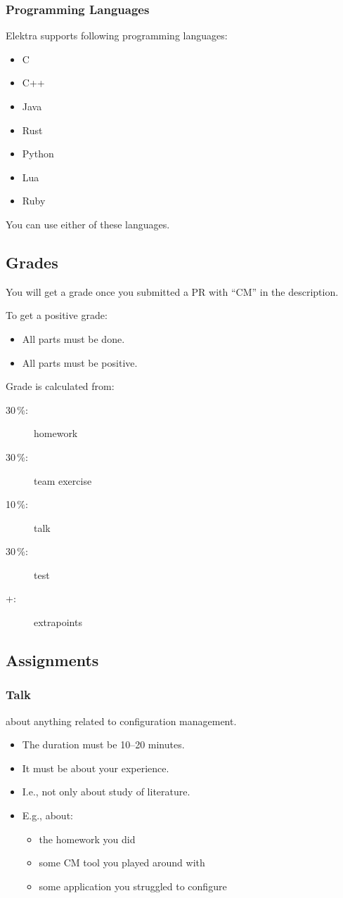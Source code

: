 \begin{frame}
	\frametitle{Programming Languages}
	Elektra supports following programming languages:
	\begin{itemize}
		\item C
		\item C++
		\item Java
		\item Rust
		\item Python
		\item Lua
		\item Ruby
	\end{itemize}
	You can use either of these languages.
\end{frame}

\subsection{Grades}

\begin{frame}
	You will get a grade once you submitted a PR with ``CM'' in the description.
	\vspace{1cm}

	To get a positive grade:
	\begin{itemize}
		\item All parts must be done.
		\item All parts must be positive.
	\end{itemize}
\end{frame}

\begin{frame}
	Grade is calculated from:
	\begin{description}
	\item[30\,\%:] homework
	\item[30\,\%:] team exercise
	\item[10\,\%:] talk
	\item[30\,\%:] test
	\item[+:] extrapoints
	\end{description}
\end{frame}

\subsection{Assignments}
\begin{frame}
	\frametitle{Talk}
	about anything related to configuration management.
	\begin{itemize}
		\item The duration must be 10--20 minutes.
		\item It must be about your experience.
		\item I.e., not only about study of literature.
		\item E.g., about:
		\begin{itemize}
			\item the homework you did
			\item some CM tool you played around with
			\item some application you struggled to configure
		\end{itemize}
	\end{itemize}
\end{frame}

